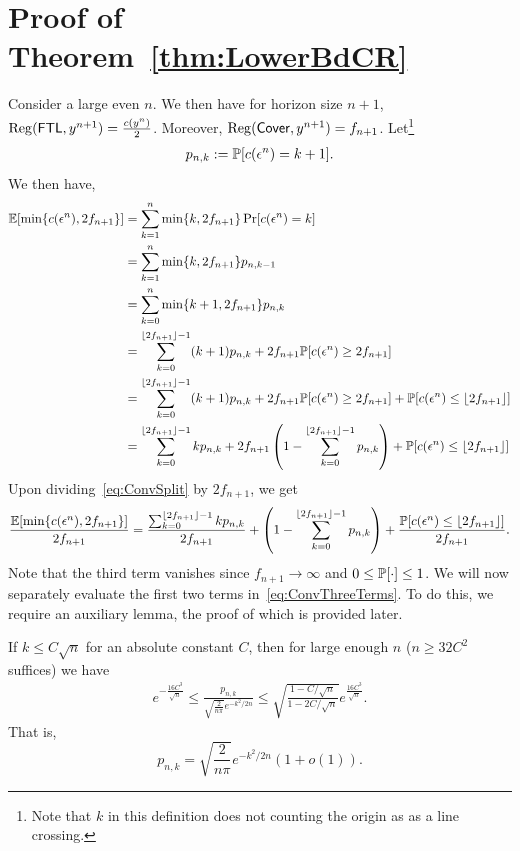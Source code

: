 \section{Proof of Theorem~\ref{thm:LowerBdCR}} \label{appendix:conversepf}
    Consider a large even $n$. We then have for horizon size $n+1$, $\mathrm{Reg}(\mathsf{FTL},y^{n+1}) = \frac{c(y^n)}{2}$.  Moreover, $\mathrm{Reg}(\mathsf{Cover},y^{n+1}) = f_{n+1}$. Let\footnote{Note that $k$ in this definition does not counting the origin as as a line crossing.}
    \begin{align}\label{eq:PnkDefn}
        p_{n,k} \mathrel{\mathop{:}}= \mathbb{P}[c(\epsilon^{n}) = k+1].
    \end{align}
    We then have,
    \begin{align}
     \operatorname{\mathbb{E}}[\min\{c(\epsilon^n), 2f_{n+1}\}] &= \sum_{k=1}^n \min\{k, 2f_{n+1}\} \Pr[c(\epsilon^n) = k]\nonumber\\
        &= \sum_{k=1}^n \min\{k, 2f_{n+1}\} p_{n,k-1} \nonumber\\
        &= \sum_{k=0}^n \min\{k+1,2f_{n+1}\}p_{n,k} \nonumber\\
        &= \sum_{k=0}^{\lfloor 2f_{n+1} \rfloor-1} (k+1)p_{n,k} + 2f_{n+1} \mathbb{P}[c(\epsilon^n) \ge 2f_{n+1}] \nonumber\\
        &= \sum_{k=0}^{\lfloor 2f_{n+1} \rfloor-1} (k+1)p_{n,k} + 2f_{n+1} \mathbb{P}[c(\epsilon^n) \ge 2f_{n+1}] + \mathbb{P}[c(\epsilon^n) \le \lfloor 2f_{n+1}\rfloor] \nonumber\\
        &=  \sum_{k=0}^{\lfloor 2f_{n+1} \rfloor-1} kp_{n,k} + 2f_{n+1} \left(1-\sum_{k=0}^{\lfloor 2f_{n+1} \rfloor-1} p_{n,k}\right) +  \mathbb{P}[c(\epsilon^n) \le \lfloor 2f_{n+1}\rfloor] \label{eq:ConvSplit}
    \end{align} 
    Upon dividing~\cref{eq:ConvSplit} by $2f_{n+1}$, we get 
    \begin{align} \label{eq:ConvThreeTerms}
      \frac{\operatorname{\mathbb{E}}[\min\{c(\epsilon^n), 2f_{n+1}\}]}{2f_{n+1}}  = \frac{\sum_{k=0}^{\lfloor 2f_{n+1} \rfloor-1} kp_{n,k}}{2f_{n+1}} +  \left(1-\sum_{k=0}^{\lfloor 2f_{n+1} \rfloor-1} p_{n,k}\right) +  \frac{\mathbb{P}[c(\epsilon^n) \le \lfloor 2f_{n+1}\rfloor]}{2f_{n+1}}.
    \end{align}
    Note that the third term vanishes since $f_{n+1} \to \infty$ and $0 \le \mathbb{P}[\cdot] \le 1$. We will now separately evaluate the first two terms in~\cref{eq:ConvThreeTerms}. To do this, we require an auxiliary lemma, the proof of which is provided later.
    \begin{lemma}\label{lem:pnkasymptotics}
        If $k \le C\sqrt{n}$ for an absolute constant $C$, then for large enough $n$ ($n \ge 32C^2$ suffices) we have
        \begin{align}\label{eq:pnkDensityApprox}
            e^{-\frac{16C^3}{\sqrt{n}}} \le \frac{p_{n,k}}{\sqrt{\frac{2}{n\pi}}e^{-k^2/2n}} \le \sqrt{\frac{1-C/\sqrt{n}}{1-2C/\sqrt{n}}} e^{\frac{16C^3}{\sqrt{n}}}.
        \end{align}
        That is,
        \[
        p_{n,k} = \sqrt{\frac{2}{n\pi}}e^{-k^2/2n} (1+o(1)).
        \]
    \end{lemma}
